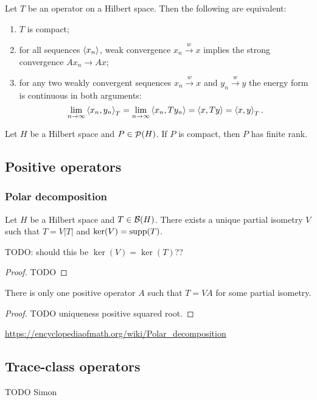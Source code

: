 \begin{proposition}
Let $T$ be an operator on a Hilbert space. Then the following are equivalent:
\begin{enumerate}
\item $T$ is compact;
\item for all sequences $\left\langle x_n \right\rangle$, weak convergence $x_n \overset{w}{\to} x$ implies the strong convergence $Ax_n \to Ax$;
\item for any two weakly convergent sequences $x_n\overset{w}{\to} x$ and $y_n\overset{w}{\to} y$ the energy form is continuous in both arguments:
\[ \lim_{n\to\infty}\left\langle x_n,y_n \right\rangle_T = \lim_{n\to\infty}\left\langle x_n,Ty_n \right\rangle = \left\langle x,Ty \right\rangle = \left\langle x,y \right\rangle_T. \]
\end{enumerate} 
\end{proposition}

\begin{lemma}
Let $H$ be a Hilbert space and $P\in\mathop{\mathcal{P}}\nolimits(H)$. If $P$ is compact, then $P$ has finite rank.
\end{lemma}

\subsection{Positive operators}

\subsubsection{Polar decomposition}
\begin{proposition}
Let $H$ be a Hilbert space and $T\in \operatorname{\mathcal{B}}(H)$. There exists a unique partial isometry $V$ such that $T = V|T|$ and $\ker(V) = \operatorname{supp}(T)$.
\end{proposition}
TODO: should this be $\ker(V) = \ker(T)$??
\begin{proof}
TODO
\end{proof}
\begin{lemma}
There is only one positive operator $A$ such that $T = VA$ for some partial isometry.
\end{lemma}
\begin{proof}
TODO uniqueness positive squared root.
\end{proof}

\url{https://encyclopediaofmath.org/wiki/Polar_decomposition}

\subsection{Trace-class operators}
TODO Simon


